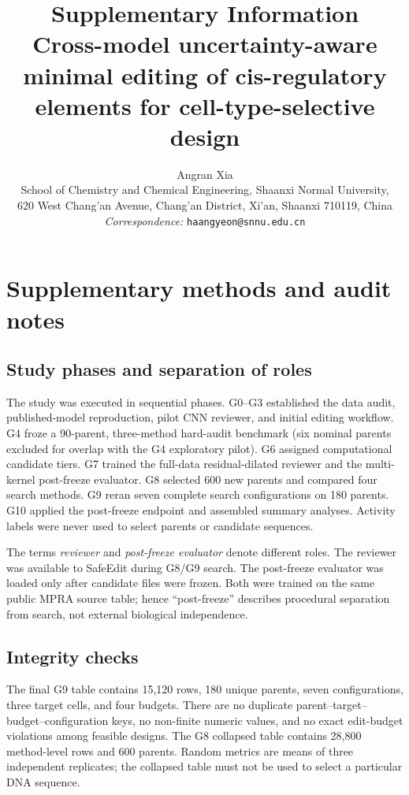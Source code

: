 \documentclass[10pt,a4paper]{article}
\title{\textbf{Supplementary Information}\\[0.35em]
\large Cross-model uncertainty-aware minimal editing of cis-regulatory elements for cell-type-selective design}
\author{Angran Xia\\
School of Chemistry and Chemical Engineering, Shaanxi Normal University,\\
620 West Chang'an Avenue, Chang'an District, Xi'an, Shaanxi 710119, China\\[0.35em]
\textit{Correspondence:} \texttt{haangyeon@snnu.edu.cn}}
\date{}
\begin{document}
\maketitle
\tableofcontents
\clearpage

\section{Supplementary methods and audit notes}

\subsection{Study phases and separation of roles}

The study was executed in sequential phases. G0--G3 established the data audit,
published-model reproduction, pilot CNN reviewer, and initial editing workflow. G4
froze a 90-parent, three-method hard-audit benchmark (six nominal parents excluded for overlap with the G4 exploratory pilot). G6 assigned computational
candidate tiers. G7 trained the full-data residual-dilated reviewer and the
multi-kernel post-freeze evaluator. G8 selected 600 new parents and compared four search
methods. G9 reran seven complete search configurations on 180 parents. G10 applied
the post-freeze endpoint and assembled summary analyses. Activity labels were never used
to select parents or candidate sequences.

The terms \emph{reviewer} and \emph{post-freeze evaluator} denote different roles. The
reviewer was available to SafeEdit during G8/G9 search. The post-freeze evaluator was
loaded only after candidate files were frozen. Both were trained on the same public
MPRA source table; hence ``post-freeze'' describes procedural separation from search, not
external biological independence.

\subsection{Integrity checks}

The final G9 table contains 15,120 rows, 180 unique parents, seven configurations,
three target cells, and four budgets. There are no duplicate
parent--target--budget--configuration keys, no non-finite numeric values, and no exact
edit-budget violations among feasible designs. The G8 collapsed table contains
28,800 method-level rows and 600 parents. Random metrics are means of three independent
replicates; the collapsed table must not be used to select a particular DNA sequence.
\end{document}
